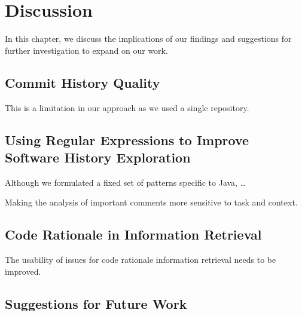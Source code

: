 \chapter{Discussion}
\label{ch:Discussion}

In this chapter, we discuss the implications of our findings and suggestions for further investigation to expand on our work.


\section{Commit History Quality}

This is a limitation in our approach as we used a single repository.


\section{Using Regular Expressions to Improve Software History Exploration}

Although we formulated a fixed set of patterns specific to Java, \dots {}

Making the analysis of important comments more sensitive to task and context.


\section{Code Rationale in Information Retrieval}

The usability of issues for code rationale information retrieval needs to be improved.


\section{Suggestions for Future Work}

\endinput

Any text after an \endinput is ignored.
You could put scraps here or things in progress.